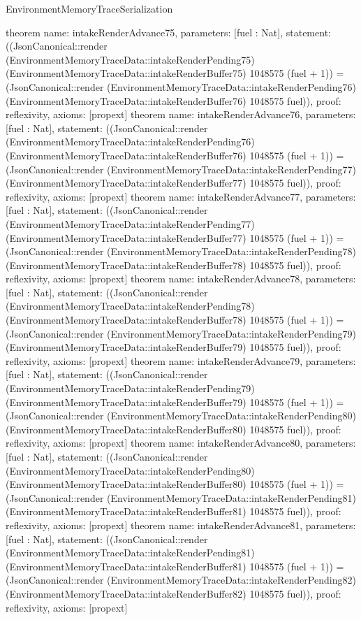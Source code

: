 \begin{lexlean}{EnvironmentMemoryTraceSerialization}
\begin{semanticmodule}
{}
theorem{
 name: intakeRenderAdvance75, parameters: [fuel : Nat],
 statement: ((JsonCanonical::render (EnvironmentMemoryTraceData::intakeRenderPending75) (EnvironmentMemoryTraceData::intakeRenderBuffer75) 1048575 (fuel + 1)) = (JsonCanonical::render (EnvironmentMemoryTraceData::intakeRenderPending76) (EnvironmentMemoryTraceData::intakeRenderBuffer76) 1048575 fuel)), proof: reflexivity{}, axioms: [propext]
}
theorem{
 name: intakeRenderAdvance76, parameters: [fuel : Nat],
 statement: ((JsonCanonical::render (EnvironmentMemoryTraceData::intakeRenderPending76) (EnvironmentMemoryTraceData::intakeRenderBuffer76) 1048575 (fuel + 1)) = (JsonCanonical::render (EnvironmentMemoryTraceData::intakeRenderPending77) (EnvironmentMemoryTraceData::intakeRenderBuffer77) 1048575 fuel)), proof: reflexivity{}, axioms: [propext]
}
theorem{
 name: intakeRenderAdvance77, parameters: [fuel : Nat],
 statement: ((JsonCanonical::render (EnvironmentMemoryTraceData::intakeRenderPending77) (EnvironmentMemoryTraceData::intakeRenderBuffer77) 1048575 (fuel + 1)) = (JsonCanonical::render (EnvironmentMemoryTraceData::intakeRenderPending78) (EnvironmentMemoryTraceData::intakeRenderBuffer78) 1048575 fuel)), proof: reflexivity{}, axioms: [propext]
}
theorem{
 name: intakeRenderAdvance78, parameters: [fuel : Nat],
 statement: ((JsonCanonical::render (EnvironmentMemoryTraceData::intakeRenderPending78) (EnvironmentMemoryTraceData::intakeRenderBuffer78) 1048575 (fuel + 1)) = (JsonCanonical::render (EnvironmentMemoryTraceData::intakeRenderPending79) (EnvironmentMemoryTraceData::intakeRenderBuffer79) 1048575 fuel)), proof: reflexivity{}, axioms: [propext]
}
theorem{
 name: intakeRenderAdvance79, parameters: [fuel : Nat],
 statement: ((JsonCanonical::render (EnvironmentMemoryTraceData::intakeRenderPending79) (EnvironmentMemoryTraceData::intakeRenderBuffer79) 1048575 (fuel + 1)) = (JsonCanonical::render (EnvironmentMemoryTraceData::intakeRenderPending80) (EnvironmentMemoryTraceData::intakeRenderBuffer80) 1048575 fuel)), proof: reflexivity{}, axioms: [propext]
}
theorem{
 name: intakeRenderAdvance80, parameters: [fuel : Nat],
 statement: ((JsonCanonical::render (EnvironmentMemoryTraceData::intakeRenderPending80) (EnvironmentMemoryTraceData::intakeRenderBuffer80) 1048575 (fuel + 1)) = (JsonCanonical::render (EnvironmentMemoryTraceData::intakeRenderPending81) (EnvironmentMemoryTraceData::intakeRenderBuffer81) 1048575 fuel)), proof: reflexivity{}, axioms: [propext]
}
theorem{
 name: intakeRenderAdvance81, parameters: [fuel : Nat],
 statement: ((JsonCanonical::render (EnvironmentMemoryTraceData::intakeRenderPending81) (EnvironmentMemoryTraceData::intakeRenderBuffer81) 1048575 (fuel + 1)) = (JsonCanonical::render (EnvironmentMemoryTraceData::intakeRenderPending82) (EnvironmentMemoryTraceData::intakeRenderBuffer82) 1048575 fuel)), proof: reflexivity{}, axioms: [propext]
}
\end{semanticmodule}
\end{lexlean}
